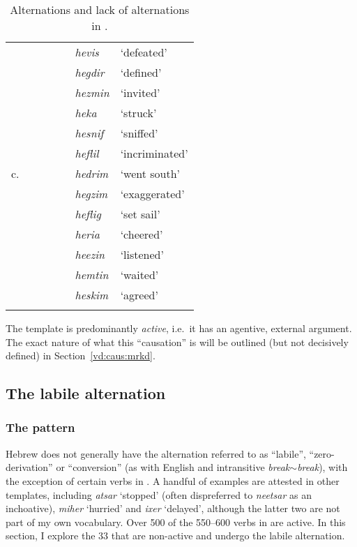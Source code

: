 \begin{exe}
\begin{xlist}
\begin{xlist}
\begin{exe}
\begin{table}
\begin{tabularx}{\textwidth}{lllllll}
	& &&&& \emph{hevis} & `defeated'\\
	& &&&& \emph{hegdir} & `defined'\\
	& &&&& \emph{hezmin} & `invited'\\
	& &&&& \emph{heka} & `struck'\\
	& &&&& \emph{hesnif} & `sniffed'\\
	& &&&& \emph{heflil} & `incriminated'\\
	\tablevspace
	c.	& &&&&  \emph{hedrim} & `went south' \\
		& &&&&  \emph{hegzim} & `exaggerated' \\
		& &&&&  \emph{heflig} & `set sail' \\
		& &&&&  \emph{heria} & `cheered' \\
		& &&&& \emph{heezin} & `listened'\\
		& &&&& \emph{hemtin} & `waited'\\
		& &&&& \emph{heskim} & `agreed'\\
\lspbottomrule
 	\end{tabularx}
	\caption{Alternations and lack of alternations in {\thif}.}
	\label{table:vd:alternations-heb-long} 
\end{table}

The template is predominantly \emph{active}, i.e.~it has an agentive, external argument. The exact nature of what this ``causation'' is will be outlined (but not decisively defined) in Section~\ref{vd:caus:mrkd}.


	\subsection{The labile alternation} \label{vd:thif:inch}
		\subsubsection{The pattern}
Hebrew does not generally have the alternation referred to as ``labile'', ``zero-derivation'' or ``conversion'' (as with English  and intransitive \emph{break}$\sim$\emph{break}), with the exception of certain verbs in {\thif}. A handful of examples are attested in other templates, including \emph{a{ts}ar} `stopped' (often dispreferred to \emph{nee{ts}ar} as an inchoative), \emph{miher} `hurried' and \emph{ixer} `delayed', although the latter two are not part of my own  vocabulary. Over 500 of the 550--600 verbs in {\thif} are active. In this section, I explore the 33 that are non-active and undergo the labile alternation.


\end{exe}
\end{xlist}
\end{xlist}
\end{exe}
